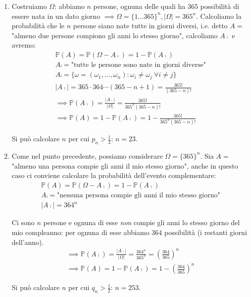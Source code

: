 \begin{enumerate}
\item Costruiamo $\Omega $: abbiamo $n$ persone, ognuna delle quali ha $365$ possibilità di essere nata in un dato giorno $\implies \Omega =\{1\dotsc 365\}^{n} ,| \Omega | =365^{n}$. Calcoliamo la probabilità che le $n$ persone siano nate tutte in giorni diversi, i.e. detto $A=$ "almeno due persone compiono gli anni lo stesso giorno", calcoliamo $A\comp$ e avremo:\begin{equation*}
\begin{array}{ l }
\mathbb{P}( A) =\mathbb{P}\left( \Omega -A\comp\right) =1-\mathbb{P}\left( A\comp\right)\\
A\comp =\text{"tutte le persone sono nate in giorni diverse"}\\
A\comp =\{\omega =( \omega _{1} ,\dotsc ,\omega _{n}) :\omega _{i} \neq \omega _{j} \ \forall i\neq j\}\\
\left| A\comp\right| =365\cdot 364\cdots ( 365-n+1) =\frac{365!}{( 365-n) !}\\
\mathbb{\implies P}\left( A\comp\right) =\frac{\left| A\comp\right| }{| \Omega | } =\frac{365!}{365^{n}( 365-n) !}\\
\mathbb{\implies P}( A) =1-\mathbb{P}\left( A\comp\right) =1-\frac{365!}{365^{n}( 365-n) !}
\end{array}
\end{equation*}

Si può calcolare $n$ per cui $p_{n}  >\frac{1}{2}$: $n=23$.
\item Come nel punto precedente, possiamo considerare $\Omega =\{365\}^{n}$. Sia $A=$ "almeno una persona compie gli anni il mio stesso giorno", anche in questo caso ci conviene calcolare la probabilità dell'evento complementare:\begin{equation*}
\begin{array}{ l }
\mathbb{P}( A) =\mathbb{P}\left( \Omega -A\comp\right) =1-\mathbb{P}\left( A\comp\right)\\
A\comp =\text{"nessuna persona compie gli anni il mio stesso giorno"}\\
\left| A\comp\right| =364^{n}
\end{array}
\end{equation*}

Ci sono $n$ persone e ognuna di esse \textit{non} compie gli anni lo stesso giorno del mio compleanno: per ognuna di esse abbiamo $364$ possibilità (i restanti giorni dell'anno).\begin{equation*}
\begin{array}{ l }
\mathbb{\implies P}\left( A\comp\right) =\frac{\left| A\comp\right| }{| \Omega | } =\frac{364^{n}}{365^{n}} =\left(\frac{364}{365}\right)^{n}\\
\mathbb{\implies P}( A) =1-\mathbb{P}\left( A\comp\right) =1-\left(\frac{364}{365}\right)^{n}
\end{array}
\end{equation*}

Si può calcolare $n$ per cui $q_{n}  >\frac{1}{2}$: $n=253$.
\end{enumerate}
\Soluzione

